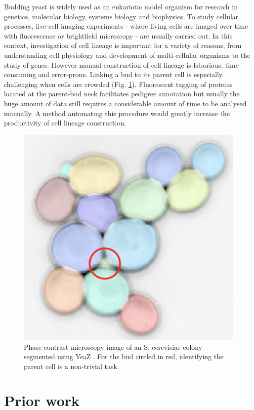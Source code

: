 \documentclass{TP}
\begin{document}
Budding yeast is widely used as an eukariotic model organism for research in genetics, molecular biology, systems biology and biophysics. To study cellular processes, live-cell imaging experiments - where living cells are imaged over time with fluorescence or brightfield microscopy - are usually carried out. In this context, investigation of cell lineage is important for a variety of reasons, from understanding cell physiology and development of multi-cellular organisms to the study of genes. However manual construction of cell lineage is laborious, time consuming and error-prone. Linking a bud to its parent cell is especially challenging when cells are crowded (Fig. \ref{crowded}). Fluorescent tagging of proteins located at the parent-bud neck facilitates pedigree annotation but usually the huge  amount  of data still requires a considerable amount of time to be analysed manually. A method automating this procedure would greatly increase the productivity of cell lineage construction.

\begin{figure}[H]
\centering
\includegraphics[width=0.76\linewidth]{Schemas et illustrations/crowded.png}
\captionsetup{justification=raggedright}
\caption{Phase contrast microscopy image of an S. cerevisiae colony segmented using YeaZ \cite{yeaz}. For the bud circled in red, identifying the parent cell is a non-trivial task.}
\label{crowded}
\end{figure}

\section{Prior work}
\end{document}
